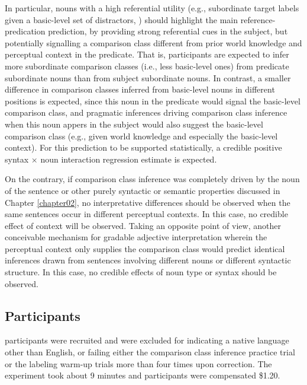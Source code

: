 In particular, nouns with a high referential utility (e.g., subordinate target labels given a basic-level set of distractors, \textcite[cf.][]{graf2016animal}) should highlight the main reference-predication prediction, by providing strong referential cues in the subject, but potentially signalling a comparison class different from prior world knowledge and perceptual context in the predicate. That is, participants are expected to infer more subordinate comparison classes (i.e., less basic-level ones) from predicate subordinate nouns than from subject subordinate nouns. In contrast, a smaller difference in comparison classes inferred from basic-level nouns in different positions is expected, since this noun in the predicate would signal the basic-level comparison class, and pragmatic inferences driving comparison class inference when this noun appers in the subject would also suggest the basic-level comparison class (e.g., given world knowledge and especially the basic-level context). 
For this prediction to be supported statistically, a credible positive syntax $\times$ noun interaction regression estimate is expected.
 
On the contrary, if comparison class inference was completely driven by the noun of the sentence or other purely syntactic or semantic properties discussed in Chapter \ref{chapter02}, no interpretative differences should be observed when the same sentences occur in different perceptual contexts. In this case, no credible effect of context will be observed. Taking an opposite point of view, another conceivable mechanism for gradable adjective interpretation wherein the perceptual context only supplies the comparison class would predict identical inferences drawn from sentences involving different nouns or different syntactic structure. In this case, no credible effects of noun type or syntax should be observed. 

\subsection{Participants}
 participants were recruited and  were excluded for indicating a native language other than English, or failing either the comparison class inference practice trial or the labeling warm-up trials more than four times upon correction. The experiment took about 9 minutes and participants were compensated \$1.20. 

